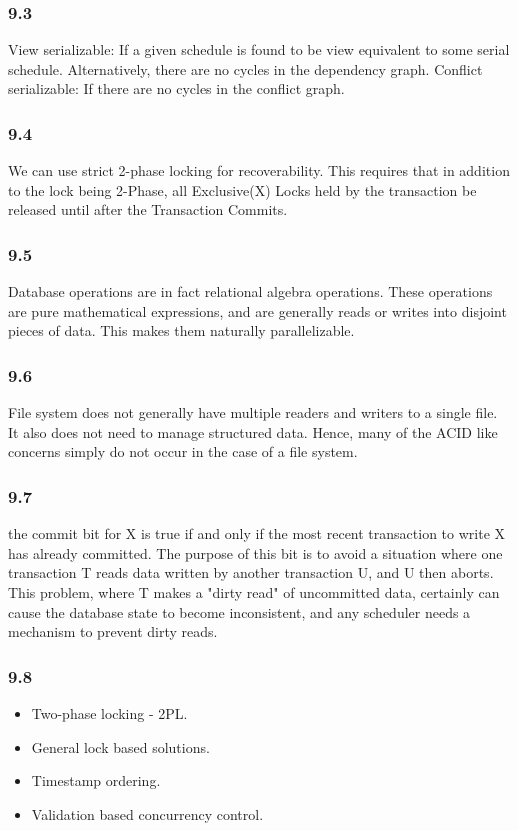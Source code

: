\documentclass{article}
\begin{document}
\subsubsection{9.3}

View serializable: If a given schedule is found to be view equivalent to some serial schedule. Alternatively,
  there are no cycles in the dependency graph.
Conflict serializable: If there are no cycles in the conflict graph.


\subsubsection{9.4}

We can use strict 2-phase locking for recoverability. This requires that
in addition to the lock being 2-Phase, all Exclusive(X) Locks held by the
transaction be released until after the Transaction Commits.

\subsubsection{9.5}
Database operations are in fact relational algebra operations. These
operations are pure mathematical expressions, and are generally reads or
writes into disjoint pieces of data. This makes them naturally parallelizable.


\subsubsection{9.6}
File system does not generally have multiple readers and writers to a single
file. It also does not need to manage structured data. Hence, many of the ACID
like concerns simply do not occur in the case of a file system.

\subsubsection{9.7}
the commit bit for X is true if and only if the most recent
transaction to write X has already committed. The purpose of this bit
is to avoid a situation where one transaction T reads data written by
another transaction U, and U then aborts. This problem, where T makes
a "dirty read" of uncommitted data, certainly can cause the database
state to become inconsistent, and any scheduler needs a mechanism to
prevent dirty reads.

\subsubsection{9.8}
\begin{itemize}
        \item  Two-phase locking - 2PL.
        \item General lock based solutions.
        \item Timestamp ordering.
        \item Validation based concurrency control.
\end{itemize}
\end{document}
